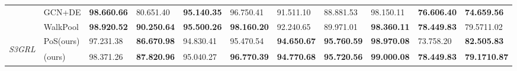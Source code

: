 \documentclass[sigconf, nonacm]{acmart}
\newcommand{\posplus}{\xspace}
\newcommand{\pos}{{P\lowercase{o}S}\xspace}
\newcommand{\ssgrl}{\textit{S3GRL}\xspace}
\newcommand{\first}{\textcolor[rgb]{0.9, 0.17, 0.31}}
\newcommand{\second}{\textcolor[rgb]{0.0, 0.0, 1.0}}
\newcommand{\third}{\textcolor[rgb]{0.55, 0.0, 0.55}}
\newcommand{\best}{\cellcolor[rgb]{0.851,0.918,0.827}}
\newcommand{\base}{\cellcolor[rgb]{1,0.949,0.8}}
\begin{document}
\begin{table*}[t]
{\begin{tabular}{p{12pt}|l|llll|lllll}
                 & GCN+DE                 & \textbf{\second{98.66{\scriptsize0.66}}}                                     & 80.65{\scriptsize1.40}                                     & \textbf{\second{95.14{\scriptsize0.35}}}                                     & 96.75{\scriptsize0.41}                                     & 91.51{\scriptsize1.10}                                     & 88.88{\scriptsize1.53}                                     & 98.15{\scriptsize0.11}                                     & \textbf{\second{76.60{\scriptsize6.40}}}                                     & \textbf{\second{74.65{\scriptsize9.56}}}                                      \\
              & WalkPool               & \base \textbf{\first{98.92{\scriptsize0.52}}}       & \base \textbf{\first{90.25{\scriptsize0.64}}}       & \base \textbf{\first{95.50{\scriptsize0.26}}}       & \base \textbf{\first{98.16{\scriptsize0.20}}}       & 92.24{\scriptsize0.65}                                     & 89.97{\scriptsize1.01}                                     & \base \textbf{\third{98.36{\scriptsize0.11}}}       & \base \textbf{\first{78.44{\scriptsize9.83}}}       & \base79.57{\scriptsize11.02}       \\ 
\hline
\multirow{3}{*}{{\begin{sideways}\ssgrl\end{sideways}}}                                                   & \pos (ours)                    & 97.23{\scriptsize1.38}                                     & \textbf{\third{86.67{\scriptsize0.98}}}                                     & 94.83{\scriptsize0.41}                                     & 95.47{\scriptsize0.54}                                     & \textbf{\second{94.65{\scriptsize0.67}}}                                     & \best \textbf{\first{95.76{\scriptsize0.59}}} & \textbf{\second{98.97{\scriptsize0.08}}}                                     & 73.75{\scriptsize8.20}                                     & \best \textbf{\first{82.50{\scriptsize5.83}}}  \\
             & \posplus (ours)                  & \best 98.37{\scriptsize1.26} & \best \textbf{\second{87.82{\scriptsize0.96}}} & \best 95.04{\scriptsize0.27} & \best \textbf{\third{96.77{\scriptsize0.39}}} & \best \textbf{\first{94.77{\scriptsize0.68}}} & \textbf{\second{95.72{\scriptsize0.56}}}                                     & \best \textbf{\first{99.00{\scriptsize0.08}}} & \best \textbf{\first{78.44{\scriptsize9.83}}} & \textbf{\third{79.17{\scriptsize10.87}}}                                     \\

\end{tabular}}
\end{table*}
\end{document}
